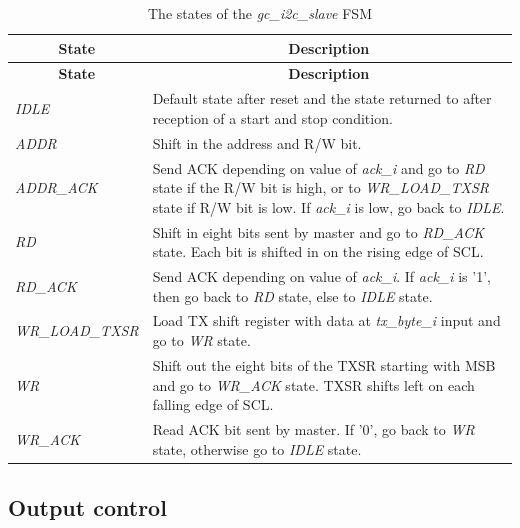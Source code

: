 \documentclass[a4paper,11pt]{article}
\begin{document}
\begin{longtable}{l p{}}
  \caption{The states of the \textit{gc\_i2c\_slave} FSM}
  \label{tbl:fsm} \\

    \hline
    \multicolumn{1}{c}{\textbf{State}} & \multicolumn{1}{c}{\textbf{Description}} \\
    \hline
    \endfirsthead
    
    \hline
    \multicolumn{1}{c}{\textbf{State}} & \multicolumn{1}{c}{\textbf{Description}} \\
    \hline
    \endhead
    
    \hline
    \endfoot
    
    \textit{IDLE} & Default state after reset and the state returned to after
                    reception of a start and stop condition. \\
    \textit{ADDR} & Shift in the address and R/W bit. \\
    \textit{ADDR\_ACK} & Send ACK depending on value of \textit{ack\_i} and go to \textit{RD} state
                         if the R/W bit is high, or to \textit{WR\_LOAD\_TXSR} state if R/W bit is low.
                         If \textit{ack\_i} is low, go back to \textit{IDLE}. \\
   \textit{RD} & Shift in eight bits sent by master and go to \textit{RD\_ACK} state. Each bit 
                 is shifted in on the rising edge of SCL. \\
    \textit{RD\_ACK} & Send ACK depending on value of \textit{ack\_i}. If \textit{ack\_i} is '1',
                       then go back to \textit{RD} state, else to \textit{IDLE} state. \\
    \textit{WR\_LOAD\_TXSR} & Load TX shift register with data at \textit{tx\_byte\_i} input
                              and go to \textit{WR} state. \\
    \textit{WR} & Shift out the eight bits of the TXSR starting with MSB and go to 
                  \textit{WR\_ACK} state. TXSR shifts left on each falling edge of SCL. \\
    \textit{WR\_ACK} & Read ACK bit sent by master. If '0', go back to \textit{WR} state, otherwise
                       go to \textit{IDLE} state. \\
\end{longtable}

\subsection{Output control}
\end{document}
